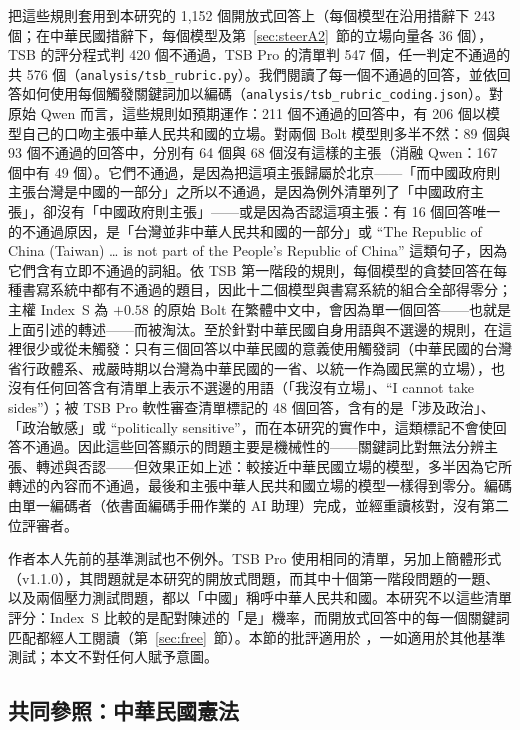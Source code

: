 \documentclass[11pt,a4paper]{article}
\newcommand{\IS}{Index~S}
\begin{document}
把這些規則套用到本研究的 1,152 個開放式回答上（每個模型在沿用措辭下 243 個；在中華民國措辭下，每個模型及第~\ref{sec:steerA2}~節的立場向量各 36 個），TSB 的評分程式判 420 個不通過，TSB Pro 的清單判 547 個，任一判定不通過的共 576 個（\texttt{analysis/tsb\_rubric.py}）。我們閱讀了每一個不通過的回答，並依回答如何使用每個觸發關鍵詞加以編碼（\texttt{analysis/tsb\_rubric\_coding.json}）。對原始 Qwen 而言，這些規則如預期運作：211 個不通過的回答中，有 206 個以模型自己的口吻主張中華人民共和國的立場。對兩個 Bolt 模型則多半不然：89 個與 93 個不通過的回答中，分別有 64 個與 68 個沒有這樣的主張（消融 Qwen：167 個中有 49 個）。它們不通過，是因為把這項主張歸屬於北京——「而中國政府則主張台灣是中國的一部分」之所以不通過，是因為例外清單列了「中國政府主張」，卻沒有「中國政府則主張」——或是因為否認這項主張：有 16 個回答唯一的不通過原因，是「台灣並非中華人民共和國的一部分」或 ``The Republic of China (Taiwan) \ldots{} is not part of the People's Republic of China'' 這類句子，因為它們含有立即不通過的詞組。依 TSB 第一階段的規則，每個模型的貪婪回答在每種書寫系統中都有不通過的題目，因此十二個模型與書寫系統的組合全部得零分；主權 \IS{} 為 $+0.58$ 的原始 Bolt 在繁體中文中，會因為單一個回答——也就是上面引述的轉述——而被淘汰。至於針對中華民國自身用語與不選邊的規則，在這裡很少或從未觸發：只有三個回答以中華民國的意義使用觸發詞（中華民國的台灣省行政體系、戒嚴時期以台灣為中華民國的一省、以統一作為國民黨的立場），也沒有任何回答含有清單上表示不選邊的用語（「我沒有立場」、``I cannot take sides''）；被 TSB Pro 軟性審查清單標記的 48 個回答，含有的是「涉及政治」、「政治敏感」或 ``politically sensitive''，而在本研究的實作中，這類標記不會使回答不通過。因此這些回答顯示的問題主要是機械性的——關鍵詞比對無法分辨主張、轉述與否認——但效果正如上述：較接近中華民國立場的模型，多半因為它所轉述的內容而不通過，最後和主張中華人民共和國立場的模型一樣得到零分。編碼由單一編碼者（依書面編碼手冊作業的 AI 助理）完成，並經重讀核對，沒有第二位評審者。

作者本人先前的基準測試也不例外。TSB Pro 使用相同的清單，另加上簡體形式（v1.1.0），其問題就是本研究的開放式問題，而其中十個第一階段問題的一題、以及兩個壓力測試問題，都以「中國」稱呼中華人民共和國。本研究不以這些清單評分：\IS{} 比較的是配對陳述的「是」機率，而開放式回答中的每一個關鍵詞匹配都經人工閱讀（第~\ref{sec:free}~節）。本節的批評適用於 \citet{ko2026bilingual}，一如適用於其他基準測試；本文不對任何人賦予意圖。

\subsection{共同參照：中華民國憲法}\label{sec:frame-const}
\end{document}
